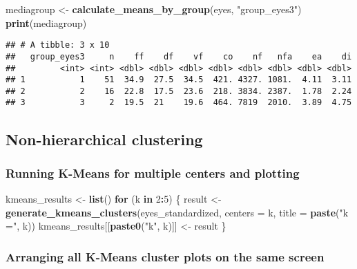 \documentclass[
]{article}
\newenvironment{Shaded}{\begin{snugshade}}{\end{snugshade}}
\newcommand{\AttributeTok}[1]{\textcolor[rgb]{0.13,0.29,0.53}{#1}}
\newcommand{\ControlFlowTok}[1]{\textcolor[rgb]{0.13,0.29,0.53}{\textbf{#1}}}
\newcommand{\DecValTok}[1]{\textcolor[rgb]{0.00,0.00,0.81}{#1}}
\newcommand{\FunctionTok}[1]{\textcolor[rgb]{0.13,0.29,0.53}{\textbf{#1}}}
\newcommand{\NormalTok}[1]{#1}
\newcommand{\OtherTok}[1]{\textcolor[rgb]{0.56,0.35,0.01}{#1}}
\newcommand{\SpecialCharTok}[1]{\textcolor[rgb]{0.81,0.36,0.00}{\textbf{#1}}}
\newcommand{\StringTok}[1]{\textcolor[rgb]{0.31,0.60,0.02}{#1}}
\begin{document}
\begin{Shaded}
\begin{Highlighting}[]
\NormalTok{mediagroup }\OtherTok{\textless{}{-}} \FunctionTok{calculate\_means\_by\_group}\NormalTok{(eyes, }\StringTok{"group\_eyes3"}\NormalTok{)}
\FunctionTok{print}\NormalTok{(mediagroup)}
\end{Highlighting}
\end{Shaded}

\begin{verbatim}
## # A tibble: 3 x 10
##   group_eyes3     n    ff    df    vf    co    nf   nfa    ea    di
##         <int> <int> <dbl> <dbl> <dbl> <dbl> <dbl> <dbl> <dbl> <dbl>
## 1           1    51  34.9  27.5  34.5  421. 4327. 1081.  4.11  3.11
## 2           2    16  22.8  17.5  23.6  218. 3834. 2387.  1.78  2.24
## 3           3     2  19.5  21    19.6  464. 7819  2010.  3.89  4.75
\end{verbatim}

\subsection{Non-hierarchical
clustering}\label{non-hierarchical-clustering}

\subsubsection{Running K-Means for multiple centers and
plotting}\label{running-k-means-for-multiple-centers-and-plotting}

\begin{Shaded}
\begin{Highlighting}[]
\NormalTok{kmeans\_results }\OtherTok{\textless{}{-}} \FunctionTok{list}\NormalTok{()}
\ControlFlowTok{for}\NormalTok{ (k }\ControlFlowTok{in} \DecValTok{2}\SpecialCharTok{:}\DecValTok{5}\NormalTok{) \{}
\NormalTok{  result }\OtherTok{\textless{}{-}} \FunctionTok{generate\_kmeans\_clusters}\NormalTok{(eyes\_standardized, }\AttributeTok{centers =}\NormalTok{ k, }\AttributeTok{title =} \FunctionTok{paste}\NormalTok{(}\StringTok{"k ="}\NormalTok{, k))}
\NormalTok{  kmeans\_results[[}\FunctionTok{paste0}\NormalTok{(}\StringTok{"k"}\NormalTok{, k)]] }\OtherTok{\textless{}{-}}\NormalTok{ result}
\NormalTok{\}}
\end{Highlighting}
\end{Shaded}

\subsubsection{Arranging all K-Means cluster plots on the same
screen}\label{arranging-all-k-means-cluster-plots-on-the-same-screen}
\end{document}
